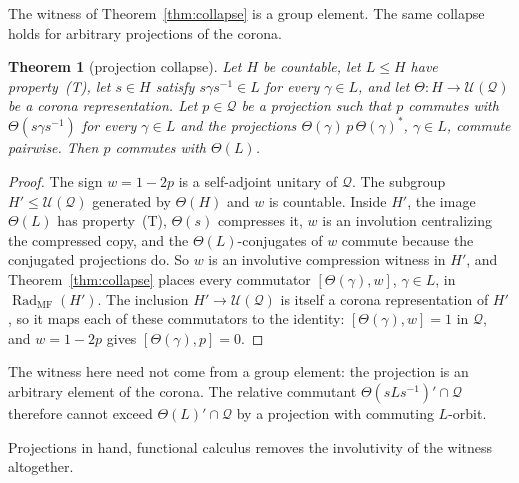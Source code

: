 \documentclass[11pt]{amsart}
\newcommand{\leanverified}[2]{\ignorespaces}
\newtheorem{theorem}{Theorem}[section]
\theoremstyle{definition}
\theoremstyle{remark}
\theoremstyle{plain}
\newcommand{\U}{\mathcal U}
\begin{document}
The witness of Theorem~\ref{thm:collapse} is a group element.  The same
collapse holds for arbitrary projections of the corona.

\begin{theorem}[projection collapse]\label{thm:projection-collapse}
Let $H$ be countable, let $L\le H$ have property~\textup{(T)}, let
$s\in H$ satisfy $s\gamma s^{-1}\in L$ for every $\gamma\in L$, and let
$\Theta\colon H\to\U(\mathcal Q)$ be a corona representation.  Let
$p\in\mathcal Q$ be a projection such that $p$ commutes with
$\Theta(s\gamma s^{-1})$ for every $\gamma\in L$ and the projections
$\Theta(\gamma)\,p\,\Theta(\gamma)^*$, $\gamma\in L$, commute pairwise.
Then $p$ commutes with $\Theta(L)$.
\leanverified{Sofic/ProjectionCompressionCollapse}{GroupApproximation.ProjectionCompressionCollapse.corona_projection_collapse}
\end{theorem}

\begin{proof}
The sign $w=1-2p$ is a self-adjoint unitary of $\mathcal Q$.  The
subgroup $H'\le\U(\mathcal Q)$ generated by $\Theta(H)$ and $w$ is
countable.  Inside $H'$, the image $\Theta(L)$ has
property~\textup{(T)}, $\Theta(s)$ compresses it, $w$ is an involution
centralizing the compressed copy, and the $\Theta(L)$-conjugates of $w$
commute because the conjugated projections do.  So $w$ is an involutive
compression witness in $H'$, and Theorem~\ref{thm:collapse} places
every commutator $[\Theta(\gamma),w]$, $\gamma\in L$, in
$\operatorname{Rad}_{\mathrm{MF}}(H')$.  The inclusion
$H'\to\U(\mathcal Q)$ is itself a corona representation of $H'$, so it
maps each of these commutators to the identity:
$[\Theta(\gamma),w]=1$ in $\mathcal Q$, and $w=1-2p$ gives
$[\Theta(\gamma),p]=0$.
\end{proof}

The witness here need not come from a group element: the projection is
an arbitrary element of the corona.  The relative commutant
$\Theta(sLs^{-1})'\cap\mathcal Q$ therefore cannot exceed
$\Theta(L)'\cap\mathcal Q$ by a projection with commuting
$L$-orbit.

Projections in hand, functional calculus removes the involutivity of
the witness altogether.
\end{document}
